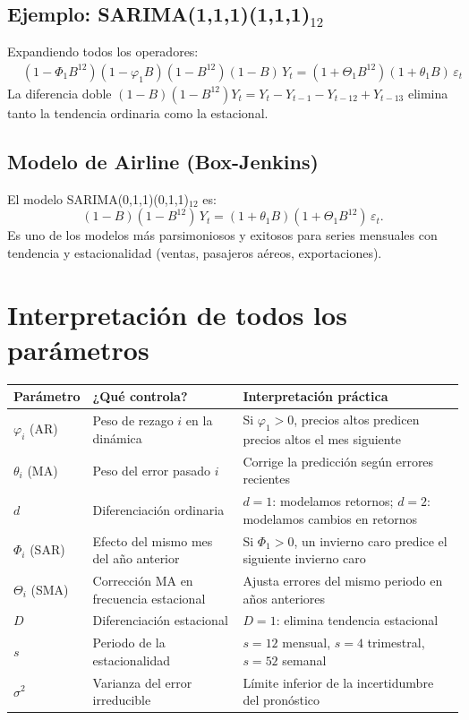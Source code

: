 \documentclass[12pt,a4paper]{article}
\theoremstyle{definition}
\begin{document}
\subsection{Ejemplo: SARIMA(1,1,1)(1,1,1)$_{12}$}

Expandiendo todos los operadores:
\begin{align*}
  &(1-\Phi_1 B^{12})(1-\varphi_1 B)(1-B^{12})(1-B)\,Y_t
  = (1+\Theta_1 B^{12})(1+\theta_1 B)\,\varepsilon_t
\end{align*}
La diferencia doble $(1-B)(1-B^{12})Y_t = Y_t - Y_{t-1} - Y_{t-12} + Y_{t-13}$
elimina tanto la tendencia ordinaria como la estacional.

\subsection{Modelo de Airline (Box-Jenkins)}

El modelo SARIMA(0,1,1)(0,1,1)$_{12}$ es:
\[
  (1-B)(1-B^{12})\,Y_t = (1+\theta_1 B)(1+\Theta_1 B^{12})\,\varepsilon_t.
\]
Es uno de los modelos más parsimoniosos y exitosos para series mensuales con
tendencia y estacionalidad (ventas, pasajeros aéreos, exportaciones).

\section{Interpretación de todos los parámetros}

\begin{center}
\renewcommand{\arraystretch}{1.3}
\begin{tabular}{p{1.8cm}p{4.5cm}p{5cm}}
\toprule
\textbf{Parámetro} & \textbf{¿Qué controla?} & \textbf{Interpretación práctica} \\
\midrule
$\varphi_i$ (AR) & Peso de rezago $i$ en la dinámica & Si $\varphi_1 > 0$, precios altos predicen precios altos el mes siguiente \\
$\theta_i$ (MA) & Peso del error pasado $i$ & Corrige la predicción según errores recientes \\
$d$ & Diferenciación ordinaria & $d=1$: modelamos retornos; $d=2$: modelamos cambios en retornos \\
$\Phi_i$ (SAR) & Efecto del mismo mes del año anterior & Si $\Phi_1 > 0$, un invierno caro predice el siguiente invierno caro \\
$\Theta_i$ (SMA) & Corrección MA en frecuencia estacional & Ajusta errores del mismo periodo en años anteriores \\
$D$ & Diferenciación estacional & $D=1$: elimina tendencia estacional \\
$s$ & Periodo de la estacionalidad & $s=12$ mensual, $s=4$ trimestral, $s=52$ semanal \\
$\sigma^2$ & Varianza del error irreducible & Límite inferior de la incertidumbre del pronóstico \\
\bottomrule
\end{tabular}
\end{center}
\end{document}
